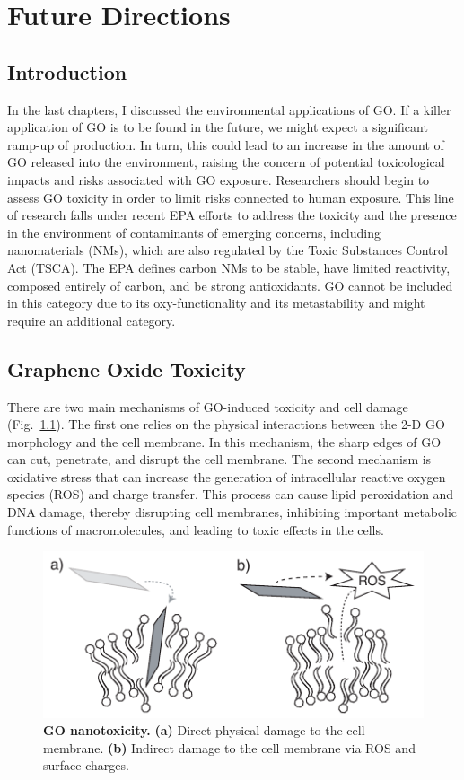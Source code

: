 \chapter{Future Directions}\label{ch:future_directions}
\dsp

\section{Introduction}
In the last chapters, I discussed the environmental applications of GO. If a killer application of GO is to be found in the future, we might expect a significant ramp-up of production. In turn, this could lead to an increase in the amount of GO released into the environment, raising the concern of potential toxicological impacts and risks associated with GO exposure. Researchers should begin to assess GO toxicity in order to limit risks connected to human exposure. This line of research falls under recent EPA efforts to address the toxicity and the presence in the environment of contaminants of emerging concerns, including nanomaterials (NMs), which are also regulated by the Toxic Substances Control Act (TSCA). The EPA defines carbon NMs to be stable, have limited reactivity, composed entirely of carbon, and be strong antioxidants. GO cannot be included in this category due to its oxy-functionality and its metastability\cite{han2019simulating} and might  require an additional category.

\section{Graphene Oxide Toxicity}
There are two main mechanisms of GO-induced toxicity and cell damage (Fig.~\ref{Fig1_fut}). The first one relies on the physical interactions between the 2-D GO morphology and the cell membrane. In this mechanism, the sharp edges of GO can cut, penetrate, and disrupt the cell membrane. \cite{li2013graphene} The second mechanism is oxidative stress that can increase the generation of intracellular reactive oxygen species (ROS) and charge transfer. This process can cause lipid peroxidation and DNA damage, thereby disrupting cell membranes, inhibiting important metabolic functions of macromolecules, and leading to toxic effects in the cells.\cite{sanchez2011biological}

\begin{figure}[t!]
  \centering
  \includegraphics[width=5in]{future/Fig1.pdf}
  \caption{\textbf{GO nanotoxicity.} \textbf{(a)}  Direct physical damage to the cell membrane. \textbf{(b)} Indirect damage to the cell membrane via ROS and surface charges.}
  \label{Fig1_fut}
\end{figure}

